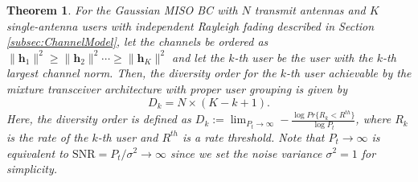 \documentclass[11pt, draft, onecolumn ]{IEEEtran}
\newtheorem{theorem}{Theorem}
\begin{document}
\begin{theorem}  \label{theo:MainResult}
For the Gaussian MISO BC with $N$ transmit antennas and $K$ single-antenna users with independent Rayleigh fading described in Section \ref{subsec:ChannelModel},  let the channels be ordered as $\|\mathbf{h}_1\|^2 \geq \|\mathbf{h}_2\|^2 \cdots\geq  \| \mathbf{h}_K\|^2$ and let the $k$-th user be the user with the $k$-th largest channel norm.
Then, the diversity order for the  $k$-th user achievable by  {}{the mixture transceiver architecture with proper user grouping} is given by
\begin{equation}
   D_k = N \times (K - k + 1).
\end{equation}
Here, the  diversity order is defined as
$D_k := \lim_{P_t \rightarrow \infty} - \frac{\log Pr\{ R_k < R^{th} \}}{\log P_t }$,
where $R_k$ is the rate of the $k$-th user and $R^{th}$ is a  rate threshold.
Note that $P_t \rightarrow \infty$ is equivalent to $\mathrm{SNR}=P_t/\sigma^2\rightarrow \infty$ since we set the noise variance  $\sigma^2=1$ for simplicity.
\end{theorem}
\end{document}
